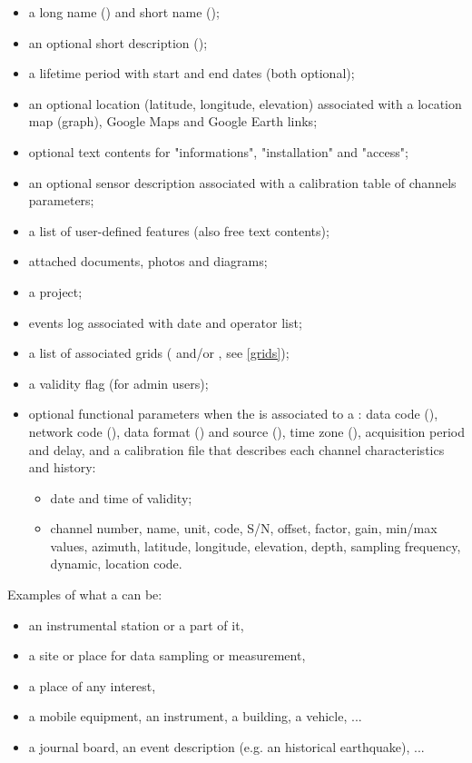 \begin{itemize}
\item    a long name () and short name ();
\item    an optional short description ();
\item    a lifetime period with start and end dates (both optional);
\item    an optional location (latitude, longitude, elevation) associated with a location map (graph), Google Maps and Google Earth links;
\item    optional text contents for "informations", "installation" and "access";
\item    an optional sensor description associated with a calibration table of channels parameters;
\item    a list of user-defined features (also free text contents);
\item    attached documents, photos and diagrams;
\item    a project;
\item    events log associated with date and operator list;
\item    a list of associated grids ( and/or , see \ref{grids});
\item    a validity flag (for admin users);
\item	 optional functional parameters when the  is associated to a : data code (), network code (), data format () and source (), time zone (), acquisition period and delay, and a calibration file that describes each channel characteristics and history:
	\begin{itemize}
	\item    date and time of validity;
	\item    channel number, name, unit, code, S/N, offset, factor, gain, min/max values, azimuth, latitude, longitude, elevation, depth, sampling frequency, dynamic, location code.
	\end{itemize}
\end{itemize}

Examples of what a  can be:
\begin{itemize}
\item    an instrumental station or a part of it,
\item    a site or place for data sampling or measurement,
\item    a place of any interest,
\item    a mobile equipment, an instrument, a building, a vehicle, ...
\item    a journal board, an event description (e.g. an historical earthquake), ...
\end{itemize}


